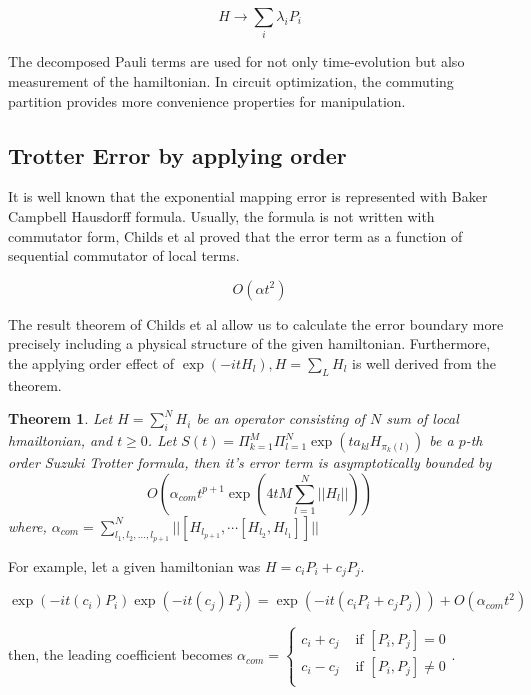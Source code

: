 \documentclass[a4paper,12pt]{article}
\newtheorem{theorem}{Theorem}
\begin{document}
\begin{equation}
    H \rightarrow \sum_i \lambda_i P_i
\end{equation}

The decomposed Pauli terms are used for not only time-evolution
but also measurement of the hamiltonian.
In circuit optimization, the commuting partition 
provides more convenience properties for manipulation.

\subsection{Trotter Error by applying order}

It is well known that the exponential mapping error is represented with Baker Campbell Hausdorff formula.
Usually, the formula is not written with commutator form, Childs et al proved that the error term 
as a function of sequential commutator of local terms\cite{childs_theory_2021}.

\begin{equation}
    O(\alpha t^2)
\end{equation}

The result theorem of Childs et al allow us to calculate 
the error boundary more precisely including a physical structure 
of the given hamiltonian.
Furthermore, the applying order effect of $\exp(-it H_l), H = \sum_L H_l$ 
is well derived from the theorem.

\begin{theorem}
    Let $H = \sum_i^N H_i$ be an operator consisting of $N$ sum of local hmailtonian,
    and $t\geq 0$.
    Let $S(t) = \Pi_{k=1}^M \Pi_{l=1}^N \exp(t a_{kl} H_{\pi_k(l)})$ be a $p$-th order
    Suzuki Trotter formula, then it's error term is asymptotically bounded by
    \begin{equation}
        O(\alpha_{com} t^{p+1} \exp(4t M \sum_{l=1}^N || H_l||))
    \end{equation}
    where, $\alpha_{com} = \sum_{l_1, l_2, \dots , l_{p+1}}^N || [H_{l_{p+1}}, \cdots [H_{l_2}, H_{l_1}]]||$
\end{theorem}

For example, let a given hamiltonian was $H = c_i P_i + c_j P_j$.

\begin{equation}
    \exp(-it (c_i) P_i) \exp(-it (c_j) P_j) = \exp(- it (c_i P_i + c_j P_j)) + O (\alpha_{com}t^2)
\end{equation}

then, the leading coefficient becomes $\alpha_{com} = \begin{cases}
    c_i + c_j & \mbox{ if } [P_i, P_j] = 0 \\
    c_i - c_j & \mbox{ if } [P_i, P_j] \neq 0 \\
\end{cases}$.
\end{document}
